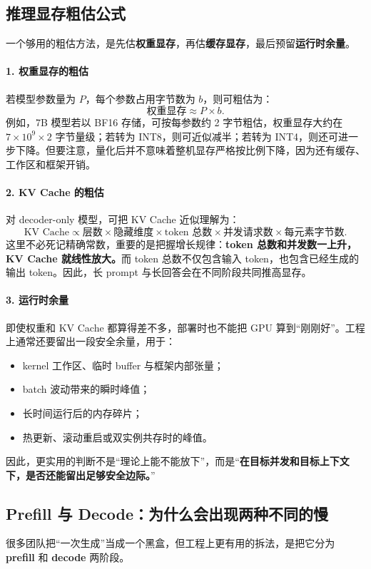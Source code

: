 \subsection{推理显存粗估公式}
一个够用的粗估方法，是先估\textbf{权重显存}，再估\textbf{缓存显存}，最后预留\textbf{运行时余量}。

\paragraph{1. 权重显存的粗估}
若模型参数量为 $P$，每个参数占用字节数为 $b$，则可粗估为：
\[
\text{权重显存} \approx P \times b.
\]
例如，7B 模型若以 BF16 存储，可按每参数约 2 字节粗估，权重显存大约在 $7 \times 10^9 \times 2$ 字节量级；若转为 INT8，则可近似减半；若转为 INT4，则还可进一步下降。但要注意，量化后并不意味着整机显存严格按比例下降，因为还有缓存、工作区和框架开销。

\paragraph{2. KV Cache 的粗估}
对 decoder-only 模型，可把 KV Cache 近似理解为：
\[
\text{KV Cache} \propto \text{层数} \times \text{隐藏维度} \times \text{token 总数} \times \text{并发请求数} \times \text{每元素字节数}.
\]
这里不必死记精确常数，重要的是把握增长规律：\textbf{token 总数和并发数一上升，KV Cache 就线性放大。}而 token 总数不仅包含输入 token，也包含已经生成的输出 token。因此，长 prompt 与长回答会在不同阶段共同推高显存。

\paragraph{3. 运行时余量}
即使权重和 KV Cache 都算得差不多，部署时也不能把 GPU 算到“刚刚好”。工程上通常还要留出一段安全余量，用于：
\begin{itemize}
  \item kernel 工作区、临时 buffer 与框架内部张量；
  \item batch 波动带来的瞬时峰值；
  \item 长时间运行后的内存碎片；
  \item 热更新、滚动重启或双实例共存时的峰值。
\end{itemize}

因此，更实用的判断不是“理论上能不能放下”，而是“\textbf{在目标并发和目标上下文下，是否还能留出足够安全边际。}”

\subsection{Prefill 与 Decode：为什么会出现两种不同的慢}
很多团队把“一次生成”当成一个黑盒，但工程上更有用的拆法，是把它分为 \textbf{prefill} 和 \textbf{decode} 两阶段。

